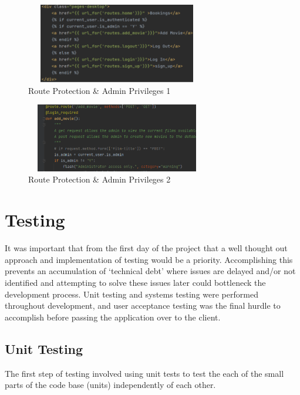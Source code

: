 \documentclass[11pt, english]{article}
\begin{document}
	\begin{figure}[H]
	\begin{center}
		\includegraphics[width=8cm,height=3.5cm]{CS993_IMG/Route1.png}
		\caption{Route Protection \& Admin Privileges 1}
	\end{center}
	\end{figure}

	\begin{figure}[H]
	\begin{center}
		\includegraphics[width=8cm,height=3cm]{CS993_IMG/Route2.png}
		\caption{Route Protection \& Admin Privileges 2}
	\end{center}
	\end{figure}

\newpage

\section{Testing}

	It was important that from the first day of the project that a well thought out approach and implementation of testing would be a priority. Accomplishing this prevents an accumulation of `technical debt' where issues are delayed and/or not identified and attempting to solve these issues later could bottleneck the development process. Unit testing and systems testing were performed throughout development, and user acceptance testing was the final hurdle to accomplish before passing the application over to the client.

	\subsection{Unit Testing}

The first step of testing involved using unit tests to test the each of the small parts of the code base (units) independently of each other.\\
\end{document}
